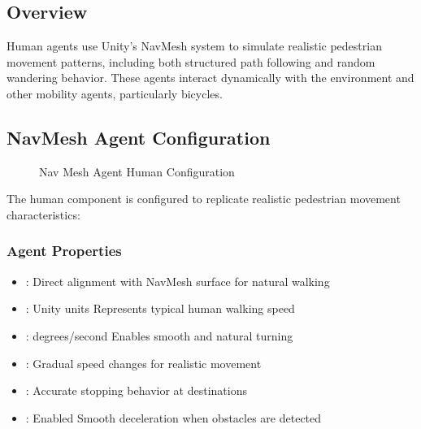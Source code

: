 \documentclass[letterpaper,10pt,english]{jupyterBook}
\begin{document}
\subsection{Overview}
\label{\detokenize{Human Agent:overview}}
\sphinxAtStartPar
Human agents use Unity’s NavMesh system to simulate realistic pedestrian movement patterns, including both structured path following and random wandering behavior. These agents interact dynamically with the environment and other mobility agents, particularly bicycles.


\subsection{NavMesh Agent Configuration}
\label{\detokenize{Human Agent:navmesh-agent-configuration}}
\begin{figure}[htbp]
\centering
\capstart

\noindent{}
\caption{Nav Mesh Agent \sphinxhyphen{} Human Configuration}\label{\detokenize{Human Agent:id1}}\end{figure}

\sphinxAtStartPar
The human  component is configured to replicate realistic pedestrian movement characteristics:


\subsubsection{Agent Properties}
\label{\detokenize{Human Agent:agent-properties}}\begin{itemize}
\item {} 
\sphinxAtStartPar
{}:  \sphinxhyphen{} Direct alignment with NavMesh surface for natural walking

\item {} 
\sphinxAtStartPar
{}:  Unity units \sphinxhyphen{} Represents typical human walking speed

\item {} 
\sphinxAtStartPar
{}:  degrees/second \sphinxhyphen{} Enables smooth and natural turning

\item {} 
\sphinxAtStartPar
{}:  \sphinxhyphen{} Gradual speed changes for realistic movement

\item {} 
\sphinxAtStartPar
{}:  \sphinxhyphen{} Accurate stopping behavior at destinations

\item {} 
\sphinxAtStartPar
{}: Enabled \sphinxhyphen{} Smooth deceleration when obstacles are detected

\end{itemize}
\end{document}
